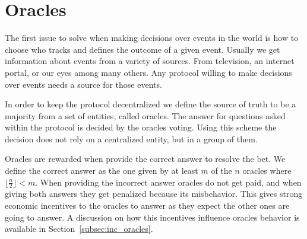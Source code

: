 \section{Oracles}

The first issue to solve when making decisions over events in the world is how
  to choose who tracks and defines the outcome of a given event.
Usually we get information about events from a variety of sources.
From television, an internet portal, or our eyes among many others. Any protocol
  willing to make decisions over events needs a source for those events.

In order to keep the protocol decentralized we define the source of truth to be
  a majority from a set of entities, called oracles.
The answer for questions asked within the protocol is decided by the oracles
  voting.
Using this scheme the decision does not rely on a centralized entity, but in a
  group of them.

Oracles are rewarded when provide the correct answer to resolve the bet.
We define the correct answer as the one given by at least $m$ of the $n$ oracles
  where $\lfloor \frac{n}{2} \rfloor < m$.
When providing the incorrect answer oracles do not get paid, and when giving
  both answers they get penalized because its misbehavior. This gives strong
  economic incentives to the oracles to answer as they expect the other ones
  are going to answer.
A discussion on how this incentives influence oracles behavior is available
  in Section~\ref{subsec:inc_oracles}.
